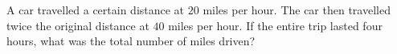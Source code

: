 A car travelled a certain distance at $20$ miles per hour. The car then travelled twice the original distance at $40$ miles per hour. If the entire trip lasted four hours, what was the total number of miles driven?

